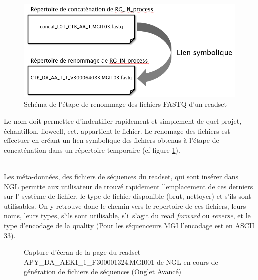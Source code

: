 \begin{minipage}{0.45\textwidth}
    \begin{figure}[H]
        \centering
        \includegraphics[width=1\textwidth]{img/Schema-renomage-fastq.png}
        \caption{\footnotesize{Schéma de l'étape de renommage des fichiers FASTQ d'un readset}}
        \label{schema-rename-fastq}
    \end{figure}
\end{minipage}
\hfill
\begin{minipage}{0.45\textwidth}
    Le nom doit permettre d'indentifier rapidement et simplement de quel projet, échantillon, flowcell, ect.
    appartient le fichier.
    Le renomage des fichiers est effectuer en créant un lien symbolique des fichiers obtenus à l'étape de \og concaténation\fg{} dans un répertoire temporaire (cf figure \ref{schema-rename-fastq}).
\end{minipage}\\

Les méta-données, des fichiers de séquences du readset, qui sont insérer dans NGL permtte aux utilisateur de trouvé rapidement l'emplacement de ces derniers sur l' système de fichier, le type de fichier disponible (brut, nettoyer) et s'ils sont utilisables.
On y retrouve donc le chemin vers le repertoire de ces fichiers, leurs noms, leurs types, s'ils sont utilisable, s'il s'agit du read \emph{forward} ou \emph{reverse}, et le type d'encodage de la quality (Pour les séquenceurs MGI l'encodage est en ASCII 33).

\begin{figure}[H]
    \centering
    \caption{\footnotesize{Capture d'écran de la page du readset APY\_DA\_AEKI\_1\_F300001324.MGI001 de NGL en cours de génération de fichiers de séquences (Onglet \og Avancé\fg{})}}
    \label{meta-data-fastq}
\end{figure}

